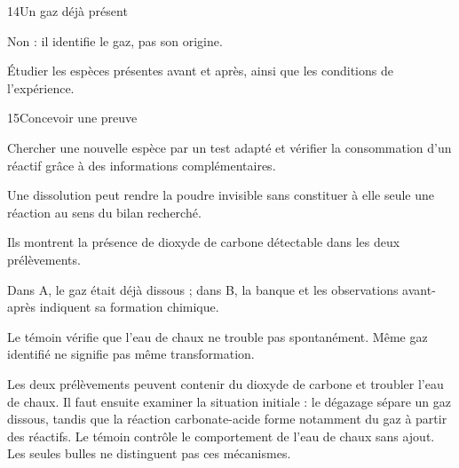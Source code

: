 \par\noindent\begin{minipage}{\linewidth}
\begin{corrige}{14}{Un gaz déjà présent}
\begin{questions}
\item Non : il identifie le gaz, pas son origine.
\item Étudier les espèces présentes avant et après, ainsi que les conditions de l’expérience.
\end{questions}
\end{corrige}
\end{minipage}
\par\noindent\begin{minipage}{\linewidth}
\begin{corrige}{15}{Concevoir une preuve}
\begin{questions}
\item Chercher une nouvelle espèce par un test adapté et vérifier la consommation d’un réactif grâce à des informations complémentaires.
\item Une dissolution peut rendre la poudre invisible sans constituer à elle seule une réaction au sens du bilan recherché.
\end{questions}
\end{corrige}
\end{minipage}
\par\noindent\begin{minipage}{\linewidth}
\label{cor-defi-6}\begin{questions}
\item Ils montrent la présence de dioxyde de carbone détectable dans les deux prélèvements.
\item Dans A, le gaz était déjà dissous ; dans B, la banque et les observations avant-après indiquent sa formation chimique.
\item Le témoin vérifie que l’eau de chaux ne trouble pas spontanément. Même gaz identifié ne signifie pas même transformation.
\end{questions}
\end{minipage}
\par\noindent\begin{minipage}{\linewidth}
\label{cor-activite-6}
Les deux prélèvements peuvent contenir du dioxyde de carbone et troubler l’eau de chaux. Il faut ensuite examiner la situation initiale : le dégazage sépare un gaz dissous, tandis que la réaction carbonate-acide forme notamment du gaz à partir des réactifs. Le témoin contrôle le comportement de l’eau de chaux sans ajout. Les seules bulles ne distinguent pas ces mécanismes.\par\end{minipage}

